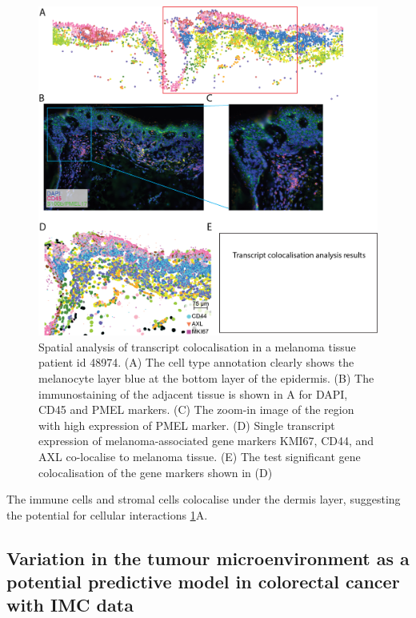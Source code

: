\begin{figure}
    \centering
    \includegraphics[width=0.8\columnwidth]{Chapter4/Figures/Chapter4_Fig3_CosMx_transcript_colocalisation.png}
    \caption[Spatial analysis of transcript colocalisation in a melanoma tissue]{Spatial analysis of transcript colocalisation in a melanoma tissue patient id 48974. (A) The cell type annotation clearly shows the melanocyte layer blue at the bottom layer of the epidermis. (B) The immunostaining of the adjacent tissue is shown in A for DAPI, CD45 and PMEL markers. (C) The zoom-in image of the region with high expression of PMEL marker. (D) Single transcript expression of melanoma-associated gene markers KMI67, CD44, and AXL co-localise to melanoma tissue. (E) The test significant gene colocalisation of the gene markers shown in (D)}
    \label{Chap4:CosMX_transcript_colo}
    
\end{figure}

The immune cells and stromal cells colocalise under the dermis layer, suggesting the potential for cellular interactions \ref{Chap4:CosMX_transcript_colo}A.

\subsection{Variation in the tumour microenvironment as a potential predictive model in colorectal cancer with IMC data}
